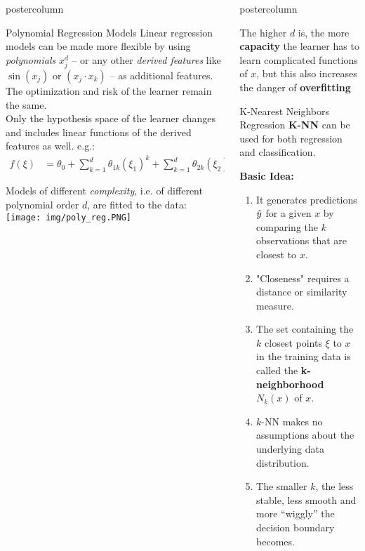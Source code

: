 \documentclass{beamer}
\newlength{\columnheight} %
\begin{document}
\begin{frame}[fragile]{}
\begin{columns}
\begin{column}{.31\textwidth}
\begin{beamercolorbox}[center]{postercolumn}
\begin{minipage}{.98\textwidth}
{\begin{myblock}{Polynomial Regression Models}
	    	Linear regression models can be made more flexible by using \emph{polynomials} $x_j^d$ -- or any other \emph{derived features} like $\sin(x_j)$ or $(x_j \cdot x_k)$ -- as additional features. The optimization and risk of the learner remain the same.\\
	    	Only the hypothesis space of the learner changes and includes linear functions of the derived features as well. e.g.:
	    	\begin{align*}
	    	f(\xi) &= \theta_0 + \sum^d_{k=1} \theta_{1k} \left(\xi_1\right)^k + \sum^d_{k=1} \theta_{2k} \left(\xi_2\right)^k + \dots
	    	\end{align*}
	    	
	    	Models of different \emph{complexity}, i.e. of different polynomial order $d$, are fitted to the data:\\
	    	\texttt{[image: img/poly\_reg.PNG]}
	    	
	    	\end{myblock}
					}
			\end{minipage}
		\end{beamercolorbox}
	\end{column}
	\begin{column}{.31\textwidth}
		\begin{beamercolorbox}[center]{postercolumn}
			\begin{minipage}{.98\textwidth}
				\parbox[t][\columnheight]{\textwidth}{
				    \begin{myblock}{ }
			The higher $d$ is, the more \textbf{capacity} the learner has to learn complicated functions of $x$, but
            this also increases the danger of \textbf{overfitting}\\
            
            \end{myblock}
						\begin{myblock}{K-Nearest Neighbors Regression}
			\textbf{K-NN} can be used for both regression and classification.\\
						\begin{codebox} \textbf{Basic Idea: }	\end{codebox}
	        \begin{enumerate}
\item It generates predictions $\hat{y}$ for a given $x$ by comparing the $k$ observations that are closest to $x$.
\item "Closeness" requires a distance or similarity measure.
\item The set containing the $k$ closest points $\xi$ to $x$ in the training data is called  the \textbf{k-neighborhood} $N_k(x)$ of $x$.
\item $k$-NN makes no assumptions about the underlying data distribution.
\item The smaller $k$, the less stable, less smooth and more \enquote{wiggly} the decision
  boundary becomes.
\end{enumerate}


\end{myblock}}
\end{minipage}
\end{beamercolorbox}
\end{column}
\end{columns}
\end{frame}
\end{document}
